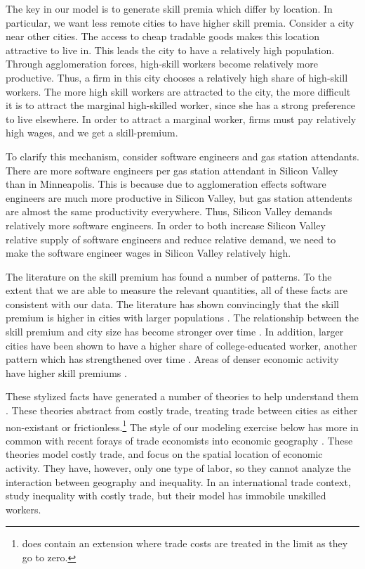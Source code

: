 \documentclass{article}
\begin{document}
The key in our model is to generate skill premia which differ by location.  In particular, we want less remote cities to have higher skill premia.  Consider a city near other cities.  The access to cheap tradable goods makes this location attractive to live in.  This leads the city to have a relatively high population.  Through agglomeration forces, high-skill workers become relatively more productive.  Thus, a firm in this city chooses a relatively high share of high-skill workers.  The more high skill workers are attracted to the city, the more difficult it is to attract the marginal high-skilled worker, since she has a strong preference to live elsewhere.  In order to attract a marginal worker, firms must pay relatively high wages, and we get a skill-premium.

To clarify this mechanism, consider software engineers and gas station attendants.  There are more software engineers per gas station attendant in Silicon Valley than in Minneapolis.  This is because due to agglomeration effects software engineers are much more productive in Silicon Valley, but gas station attendents are almost the same productivity everywhere.  Thus, Silicon Valley demands relatively more software engineers.  In order to both increase Silicon Valley relative supply of software engineers and reduce relative demand, we need to make the software engineer wages in Silicon Valley relatively high.

The literature on the skill premium has found a number of patterns.  To the extent that we are able to measure the relevant quantities, all of these facts are consistent with our data.  The literature has shown convincingly that the skill premium is higher in cities with larger populations \citep{davis2012spatial}.  The relationship between the skill premium and city size has become stronger over time \citep{baum2013inequality, lindley2014spatial}.  In addition, larger cities have been shown to have a higher share of college-educated worker, another pattern which has strengthened over time \citep{moretti2008real, lindley2014spatial}.  Areas of denser economic activity have higher skill premiums \citep{combes2012sorting}.

These stylized facts have generated a number of theories to help understand them \citep{davis2012spatial,davis2014comparative,baum2012understanding,combes2012sorting}.  These theories abstract from costly trade, treating trade between cities as either non-existant or frictionless.\footnote{\citet{davis2012spatial} does contain an extension where trade costs are treated in the limit as they go to zero.}  The style of our modeling exercise below has more in common with recent forays of trade economists into economic geography \citep{allen2014trade,desmet2014geography}.  These theories model costly trade, and focus on the spatial location of economic activity. They have, however, only one type of labor, so they cannot analyze the interaction between geography and inequality.  In an international trade context, \citet{fujita2006globalization} study inequality with costly trade, but their model has immobile unskilled workers.
\end{document}
